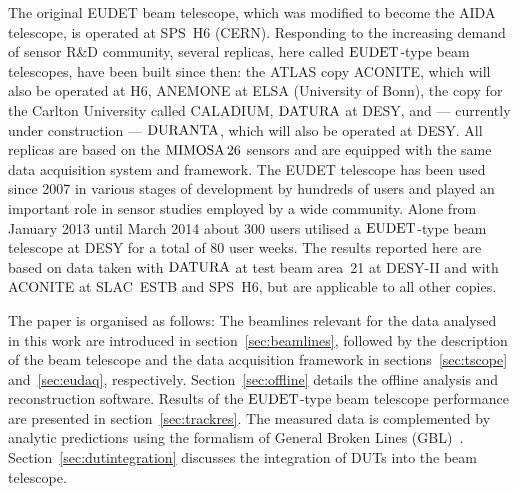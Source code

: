 The original EUDET beam telescope, which was modified to become the AIDA telescope, is operated at SPS~H6 (CERN).
Responding to the increasing demand of sensor R\&D community, several replicas, here called $\textrm{EUDET}$-type beam telescopes, have been built since then:
 the ATLAS copy ACONITE, which will also be operated at H6, ANEMONE at ELSA (University of Bonn), the copy for the Carlton University called CALADIUM, 
 $\textrm{DATURA}$ at DESY, and --- currently under construction --- $\textrm{DURANTA}$, which will also be operated at DESY. 
All replicas are based on the $\textrm{MIMOSA\,26}$ sensors and are equipped with the same data acquisition system and framework. 
The EUDET telescope has been used since 2007 in various stages of development by hundreds of users and played an important role in sensor studies employed by a wide community. 
Alone from January 2013 until March 2014 about 300 users utilised a $\textrm{EUDET}$-type beam telescope at DESY for a total of 80 user weeks. 
The results reported here are based on data taken with $\textrm{DATURA}$ at test beam area~21 at {DESY-II} and with ACONITE at SLAC~ESTB and SPS~H6, but are applicable to all other copies. 

The paper is organised as follows: 
The beamlines relevant for the data analysed in this work are introduced in section~\ref{sec:beamlines}, followed by the description of the beam telescope
 and the data acquisition framework in sections~\ref{sec:tscope} and~\ref{sec:eudaq}, respectively.
Section~\ref{sec:offline} details the offline analysis and reconstruction software. 
Results of the $\textrm{EUDET}$-type beam telescope performance are presented in section~\ref{sec:trackres}. %
The measured data is complemented by analytic predictions using the formalism of General Broken Lines (GBL)~\cite{Blobel20111760,Kleinwort-2012}.
Section~\ref{sec:dutintegration} discusses the integration of DUTs into the beam telescope. 
